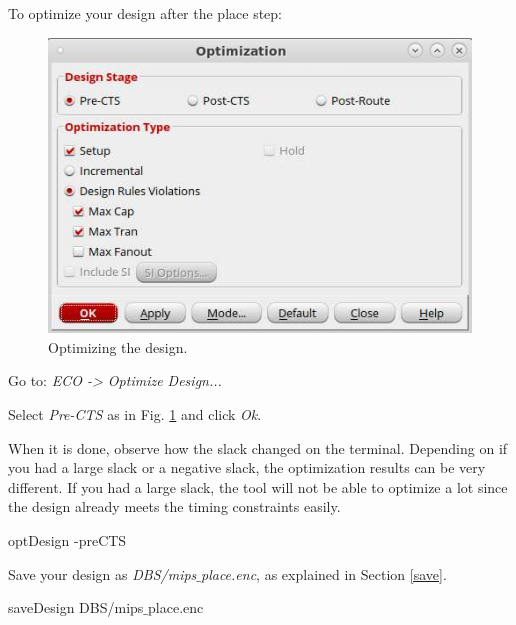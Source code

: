 		\vspace{4mm}
To optimize your design after the place step:
		\vspace{-2mm}
\begin{enumerate}
	\parbox[t]{\dimexpr\textwidth-\leftmargin}{%
		\begin{figure}
			\vspace{-10mm}
			\centering
			\vspace{-\baselineskip}
			\includegraphics[scale=0.4]{figures/lab5_backend/optimize_prects}
			\caption{Optimizing the design.}
			\label{optimize_prects}
		\end{figure}
		\item Go to: \textit{ECO -> Optimize Design...}
		\item Select \textit{Pre-CTS} as in Fig. \ref{optimize_prects} and click \textit{Ok}.
		\item When it is done, observe how the slack changed on the terminal. Depending on if you had a large slack or a negative slack, the optimization results can be very different. If you had a large slack, the tool will not be able to optimize a lot since the design already meets the timing constraints easily. 
		\begin{codeline}
			optDesign -preCTS
		\end{codeline}
		
		\item Save your design as \textit{DBS/mips$\_$place.enc}, as explained in Section \ref{save}.
		
				\begin{codeline}
		saveDesign DBS/mips$\_$place.enc
		\end{codeline}
	} 

\end{enumerate}

